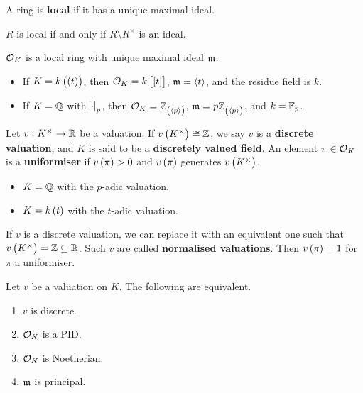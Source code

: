 A ring is \textbf{local} if it has a unique maximal ideal.

\begin{exercise*}
$ R $ is local if and only if $ R \setminus R^\times $ is an ideal.
\end{exercise*}

\begin{corollary}
$ \mathcal{O}_K $ is a local ring with unique maximal ideal $ \mathfrak{m} $.
\end{corollary}

\begin{example*}
\hfill
\begin{itemize}
\item If $ K = k\br{\br{t}} $, then $ \OOO_K = k\sbr{\sbr{t}} $, $ \mathfrak{m} = \left\langle t \right\rangle $, and the residue field is $ k $.
\item If $ K = \mathbb{Q} $ with $ \abs{\cdot}_p $, then $ \OOO_K = \ZZ_{\br{\abr{p}}} $, $ \mmm = p\ZZ_{\br{\abr{p}}} $, and $ k = \mathbb{F}_p $.
\end{itemize}
\end{example*}

\begin{definition}
Let $ v : K^\times \to \mathbb{R} $ be a valuation. If $ v\br{K^\times} \cong \ZZ $, we say $ v $ is a \textbf{discrete valuation}, and $ K $ is said to be a \textbf{discretely valued field}. An element $ \pi \in \mathcal{O}_K $ is a \textbf{uniformiser} if $ v\br{\pi} > 0 $ and $ v\br{\pi} $ generates $ v\br{K^\times} $.
\end{definition}

\begin{example*}
\hfill
\begin{itemize}
\item $ K = \mathbb{Q} $ with the $ p $-adic valuation.
\item $ K = k\br{t} $ with the $ t $-adic valuation.
\end{itemize}
\end{example*}

\pagebreak

\begin{remark*}
If $ v $ is a discrete valuation, we can replace it with an equivalent one such that $ v\br{K^\times} = \ZZ \subseteq \RR $. Such $ v $ are called \textbf{normalised valuations}. Then $ v\br{\pi} = 1 $ for $ \pi $ a uniformiser.
\end{remark*}

\begin{lemma}
\label{lem:2.6}
Let $ v $ be a valuation on $ K $. The following are equivalent.
\begin{enumerate}
\item $ v $ is discrete.
\item $ \mathcal{O}_K $ is a PID.
\item $ \mathcal{O}_K $ is Noetherian.
\item $ \mathfrak{m} $ is principal.
\end{enumerate}
\end{lemma}

